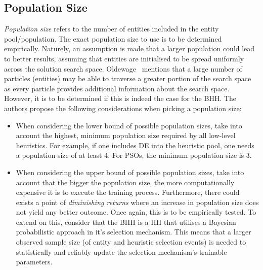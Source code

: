 \subsection{Population Size}
\label{sec:bhh:hyper_parameters:population_size}

\textit{Population size} refers to the number of entities included in the entity pool/population. The exact population size to use is to be determined empirically. Naturely, an assumption is made that a larger population could lead to better results, assuming that entities are initialised to be spread uniformly across the solution search space. Oldewage~\cite{ref:oldewage:2017} mentions that a large number of particles (entities) may be able to traverse a greater portion of the search space as every particle provides additional information about the search space. However, it is to be determined if this is indeed the case for the \ac{BHH}. The authors propose the following considerations when picking a population size:

\begin{itemize}
      \item When considering the lower bound of possible population sizes, take into account the highest, minimum population size required by all low-level heuristics. For example, if one includes \Ac{DE} into the heuristic pool, one needs a population size of at least 4. For \acp{PSO}, the minimum population size is 3.
      \item When considering the upper bound of possible population sizes, take into account that the bigger the population size, the more computationally expensive it is to execute the training process. Furthermore, there could exists a point of \textit{diminishing returns} where an increase in population size does not yield any better outcome. Once again, this is to be empirically tested. To extend on this, consider that the \Ac{BHH} is a \Ac{HH} that utilises a Bayesian probabilistic approach in it's selection mechanism. This means that a larger observed sample size (of entity and heuristic selection events) is needed to statistically and reliably update the selection mechanism's trainable parameters.
\end{itemize}

